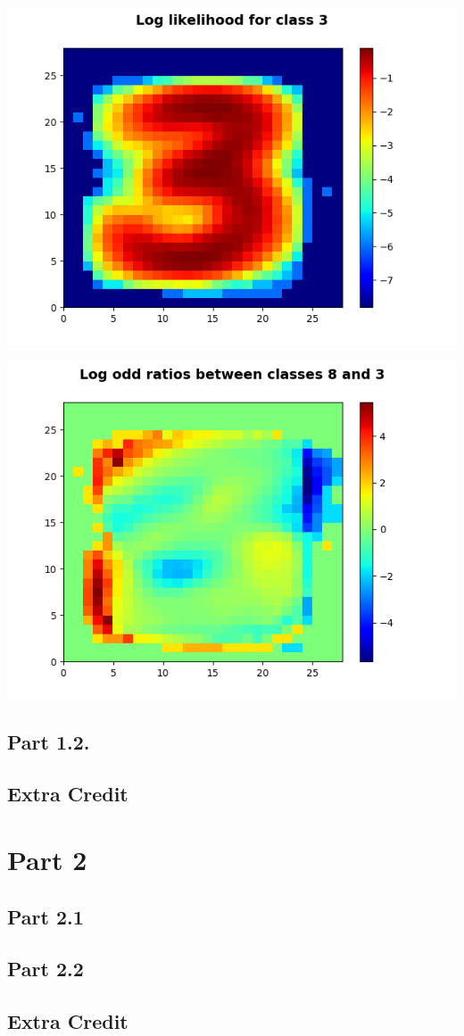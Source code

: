 \documentclass[11pt]{article}
\begin{document}
\begin{center}
\includegraphics[scale=0.75]{part1/1/log_likelihood_3.png}
\end{center}

\begin{center}
\includegraphics[scale=1]{part1/1/odd_ratio_8_3.png}
\end{center}

\subsection*{Part 1.2.}

\subsection*{Extra Credit}

\section*{Part 2}

\subsection*{Part 2.1}

\subsection*{Part 2.2}

\subsection*{Extra Credit}
\end{document}
